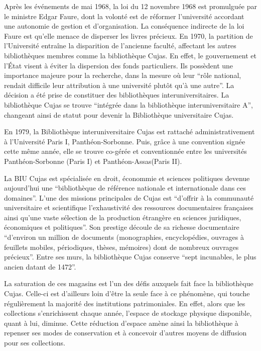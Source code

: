 Après les événements de mai 1968, la loi du 12 novembre 1968 est promulguée par le ministre Edgar Faure, dont la volonté est de réformer l'université accordant une autonomie de gestion et d'organisation. La conséquence indirecte de la loi Faure est qu'elle menace de disperser les livres précieux.  En 1970, la partition de l'Université entraîne la disparition de l'ancienne faculté, affectant les autres bibliothèques membres comme la bibliothèque Cujas. En effet, le gouvernement et l'État visent à éviter la dispersion des fonds particuliers. Ils possèdent une importance majeure pour la recherche, dans la mesure où leur \enquote{rôle national, rendait difficile leur attribution à une université plutôt qu'à une autre}. La décision a été prise de constituer des bibliothèques interuniversitaires. La bibliothèque Cujas se trouve \enquote{intégrée dans la bibliothèque interuniversitaire A}, changeant ainsi de statut pour devenir la Bibliothèque universitaire Cujas. 

En 1979, la Bibliothèque interuniversitaire Cujas est rattaché administrativement à l'Université Paris I, Panthéon-Sorbonne. Puis, grâce à une convention signée cette même année, elle se trouve co-gérée et conventionnée entre les universités Panthéon-Sorbonne (Paris I) et Panthéon-Assas(Paris II).
\bigskip

La BIU Cujas est spécialisée en droit, économmie et sciences politiques devenue aujourd'hui une \enquote{bibliothèque de référence nationale et internationale dans ces domaines}.
L'une des missions principales de Cujas est \enquote{d'offrir à la communauté universitaire et scientifique l'exhaustivité des ressources documentaires françaises ainsi qu'une vaste sélection de la production étrangère en sciences juridiques, économiques et politiques}. Son prestige découle de sa richesse documentaire \enquote{d'environ un million de documents (monographies, encyclopédies, ouvrages à feuillets mobiles, périodiques, thèses, mémoires) dont de nombreux ouvrages précieux}. Entre ses murs, la bibliothèque Cujas conserve \enquote{sept incunables, le plus ancien datant de 1472}.

La saturation de ces magasins est l'un des défis auxquels fait face la bibliothèque Cujas. Celle-ci est d'ailleurs loin d'être la seule face à ce phénomène, qui touche régulièrement la majorité des institutions patrimoniales. En effet, alors que les collections s'enrichissent chaque année, l'espace de stockage physique disponible, quant à lui, diminue. Cette réduction d'espace amène ainsi la bibliothèque à repenser ses modes de conservation et à concevoir d'autres moyens de diffusion pour ses collections.
